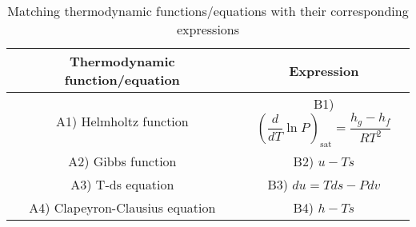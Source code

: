 \begin{table}[htbp]
\centering
\caption{Matching thermodynamic functions/equations with their corresponding expressions}
\label{tab:tables/table.tex}
\begin{tabular}{cc}
\textbf{Thermodynamic function/equation} & \textbf{Expression} \\ \hline
A1) Helmholtz function & B1) $\left(\dfrac{d}{dT}\ln P\right)_{\text{sat}}=\dfrac{h_g-h_f}{RT^2}$ \\
A2) Gibbs function & B2) $u-Ts$ \\
A3) T-ds equation & B3) $du=Tds-Pdv$ \\
A4) Clapeyron-Clausius equation & B4) $h-Ts$ \\
\end{tabular}
\end{table}
